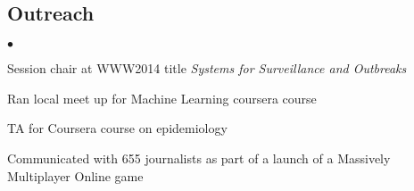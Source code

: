 \documentclass[margin,line]{res}
\newenvironment{list2}{
  \begin{list}{$\bullet$}{%
      \setlength{\itemsep}{0in}
      \setlength{\parsep}{0in} \setlength{\parskip}{0in}
      \setlength{\topsep}{0in} \setlength{\partopsep}{0in} 
      \setlength{\leftmargin}{10pt}}}{\end{list}}
\begin{document}
\begin{resume}
%



\section{\sc Outreach}
\begin{list2}
\item Session chair at WWW2014 title \emph{Systems for Surveillance and Outbreaks}
\item Ran local meet up for Machine Learning coursera course
\item TA for Coursera course on epidemiology
\item Communicated with 655 journalists as part of a launch of a Massively Multiplayer Online game
\end{list2}



\end{resume}
\end{document}
